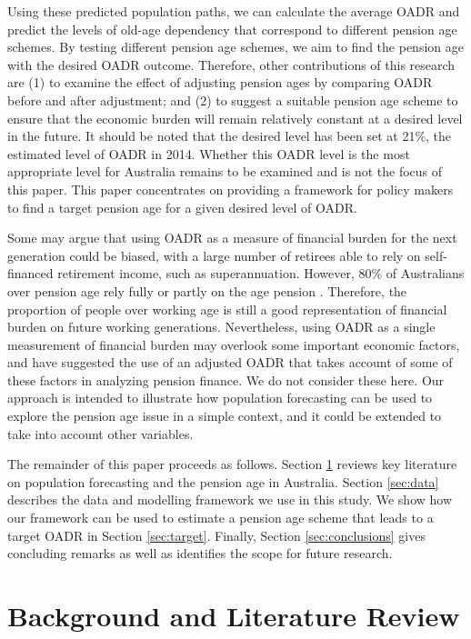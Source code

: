 \documentclass[11pt,a4paper,]{article}
\begin{document}
Using these predicted population paths, we can calculate the average
OADR and predict the levels of old-age dependency that correspond to
different pension age schemes. By testing different pension age schemes,
we aim to find the pension age with the desired OADR outcome. Therefore,
other contributions of this research are (1) to examine the effect of
adjusting pension ages by comparing OADR before and after adjustment;
and (2) to suggest a suitable pension age scheme to ensure that the
economic burden will remain relatively constant at a desired level in
the future. It should be noted that the desired level has been set at
21\%, the estimated level of OADR in 2014. Whether this OADR level is
the most appropriate level for Australia remains to be examined and is
not the focus of this paper. This paper concentrates on providing a
framework for policy makers to find a target pension age for a given
desired level of OADR.

Some may argue that using OADR as a measure of financial burden for the
next generation could be biased, with a large number of retirees able to
rely on self-financed retirement income, such as superannuation.
However, 80\% of Australians over pension age rely fully or partly on
the age pension \autocite{Power14}. Therefore, the proportion of people
over working age is still a good representation of financial burden on
future working generations. Nevertheless, using OADR as a single
measurement of financial burden may overlook some important economic
factors, and \textcite{HY12} have suggested the use of an adjusted OADR
that takes account of some of these factors in analyzing pension
finance. We do not consider these here. Our approach is intended to
illustrate how population forecasting can be used to explore the pension
age issue in a simple context, and it could be extended to take into
account other variables.

The remainder of this paper proceeds as follows. Section
\ref{sec:litreview} reviews key literature on population forecasting and
the pension age in Australia. Section \ref{sec:data} describes the data
and modelling framework we use in this study. We show how our framework
can be used to estimate a pension age scheme that leads to a target OADR
in Section \ref{sec:target}. Finally, Section \ref{sec:conclusions}
gives concluding remarks as well as identifies the scope for future
research.

\section{Background and Literature Review}\label{sec:litreview}
\end{document}
